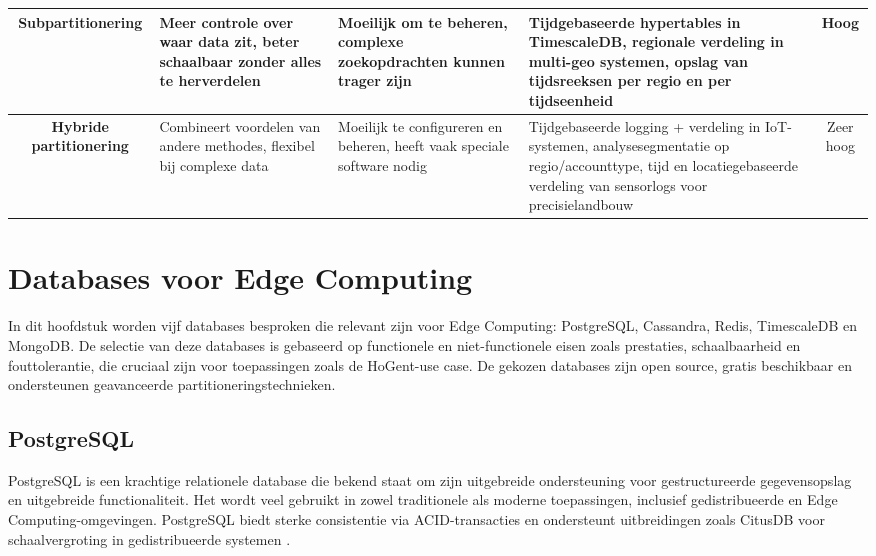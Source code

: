 \begin{table}[H]
{\begin{tabular}{|c|p{4.2cm}|p{4.5cm}|p{4.5cm}|c|}
    \textbf{Subpartitionering} & 
    Meer controle over waar data zit, beter schaalbaar zonder alles te herverdelen & 
    Moeilijk om te beheren, complexe zoekopdrachten kunnen trager zijn & 
    Tijdgebaseerde hypertables in TimescaleDB, regionale verdeling in multi-geo systemen, opslag van tijdsreeksen per regio en per tijdseenheid & 
    Hoog \\ \hline

    \textbf{Hybride partitionering} & 
    Combineert voordelen van andere methodes, flexibel bij complexe data & 
    Moeilijk te configureren en beheren, heeft vaak speciale software nodig & 
    Tijdgebaseerde logging + verdeling in IoT-systemen, analysesegmentatie op regio/accounttype, tijd en locatiegebaseerde verdeling van sensorlogs voor precisielandbouw & 
    Zeer hoog \\ \hline

    \end{tabular}%
    }
\end{table}

\noindent

\section{Databases voor Edge Computing}

In dit hoofdstuk worden vijf databases besproken die relevant zijn voor Edge Computing: PostgreSQL, Cassandra, Redis, TimescaleDB en MongoDB.
 De selectie van deze databases is gebaseerd op functionele en niet-functionele eisen zoals prestaties, schaalbaarheid en fouttolerantie, die cruciaal zijn voor toepassingen zoals de HoGent-use case. 
De gekozen databases zijn open source, gratis beschikbaar en ondersteunen geavanceerde partitioneringstechnieken.

\subsection{PostgreSQL}

PostgreSQL is een krachtige relationele database die bekend staat om zijn uitgebreide ondersteuning voor gestructureerde gegevensopslag en uitgebreide functionaliteit. Het wordt veel gebruikt in zowel traditionele als moderne toepassingen, inclusief gedistribueerde en Edge Computing-omgevingen. PostgreSQL biedt sterke consistentie via ACID-transacties en ondersteunt uitbreidingen zoals CitusDB voor schaalvergroting in gedistribueerde systemen \autocite{Kleppmann2017, PostgreSQLDocumentation}.

